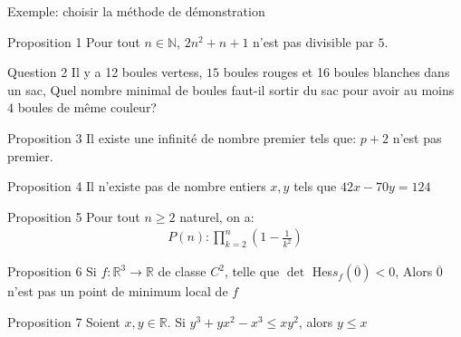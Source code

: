 \begin{parag}{Exemple: choisir la méthode de démonstration}
    \begin{subparag}{Proposition 1}
        Pour tout $n \in \mathbb{N}$, $2n^2 + n + 1$ n'est pas divisible par $5$.
    \end{subparag}
    \begin{subparag}{Question 2}
        Il y a 12 boules vertess, $15$ boules rouges et 16 boules blanches dans un sac, Quel nombre minimal de boules faut-il sortir du sac pour avoir au moins $4$ boules de même couleur?
    \end{subparag}
    \begin{subparag}{Proposition 3}
            Il existe une infinité de nombre premier tels que:
            $p + 2$ n'est pas premier.
    \end{subparag}
    \begin{subparag}{Proposition 4}
        Il n'existe pas de nombre entiers $x, y$ tels que $42x - 70 y =  124$
    \end{subparag}
    \begin{subparag}{Proposition 5}
        Pour tout $n \geq 2$ naturel, on a:
        \begin{align*} P\left(n\right): \prod_{k = 2}^{n} \left(1- \frac{1}{k^2}\right)  \end{align*}
    \end{subparag}
    \begin{subparag}{Proposition 6}
        Si $f: \mathbb{R}^{3} \to \mathbb{R}$ de classe $C^2$, telle que $\det $ Hes$s_f\left(\overline{0}\right) < 0$, Alors $\overline{0}$ n'est pas un point de minimum local de $f$
    \end{subparag}
    \begin{subparag}{Proposition 7}
        Soient $x, y \in \mathbb{R}$. Si $y^3 + yx^2 - x^3 \leq xy^2$, alors $y \leq x$
    \end{subparag}
\end{parag}
